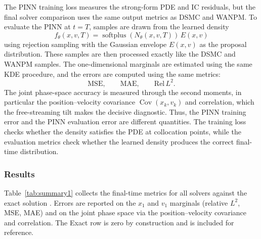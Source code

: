 \documentclass[11pt]{article}
\theoremstyle{plain}
\begin{document}
The PINN training loss measures the strong-form PDE and IC residuals, but the final solver comparison uses the same output metrics as DSMC and WANPM. To evaluate the PINN at \(t=T\), samples are drawn from the learned density
$$
f_\theta(x,v,T)
=
\operatorname{softplus}(N_\theta(x,v,T))\,E(x,v)
$$
using rejection sampling with the Gaussian envelope \(E(x,v)\) as the proposal distribution. These samples are then processed exactly like the DSMC and WANPM samples. The one-dimensional marginals are estimated using the same KDE procedure, and the errors are computed using the same metrics:
$$
\mathrm{MSE},
\qquad
\mathrm{MAE},
\qquad
\mathrm{Rel}\,L^2.
$$
The joint phase-space accuracy is measured through the second moments, in particular the position--velocity
covariance $\operatorname{Cov}(x_k,v_k)$ and correlation, which the free-streaming tilt makes the decisive
diagnostic. Thus, the PINN training error and the PINN evaluation error are different quantities. The training loss checks whether the density satisfies the PDE at collocation points, while the evaluation metrics check whether the learned density produces the correct final-time distribution.





\subsubsection{Results}
\label{sec:results}

Table~\ref{tab:summary1} collects the final-time metrics for all solvers against the exact
solution . Errors are reported on the $x_1$ and $v_1$ marginals (relative
$L^2$, MSE, MAE) and on the joint phase space via the position--velocity covariance and correlation.
The Exact row is zero by construction and is included for reference.
\end{document}
